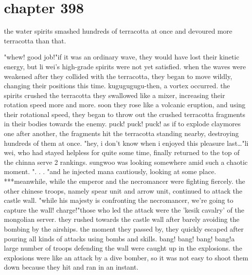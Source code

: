 \section{chapter 398}

the water spirits smashed hundreds of terracotta at once and devoured more terracotta than that.





"whew! good job!"if it was an ordinary wave, they would have lost their kinetic energy, but li wei's high-grade spirits were not yet satisfied.
 when the waves were weakened after they collided with the terracotta, they began to move wildly, changing their positions this time.
kugugugugu-then, a vortex occurred.
 the spirits crushed the terracotta they swallowed like a mixer, increasing their rotation speed more and more.
soon they rose like a volcanic eruption, and using their rotational speed, they began to throw out the crushed terracotta fragments in their bodies towards the enemy.
puck! puck! puck! as if to explode claymores one after another, the fragments hit the terracotta standing nearby, destroying hundreds of them at once.
"hey, i don't know when i enjoyed this pleasure last…"li wei, who had stayed helpless for quite some time, finally returned to the top of the chinna serve 2 rankings.
 sungwoo was looking somewhere amid such a chaotic moment.
".
.
.
"and he injected mana cautiously, looking at some place.
***meanwhile, while the emperor and the necromancer were fighting fiercely.
 the other chinese troops, namely spear unit and arrow unit, continued to attack the castle wall.
"while his majesty is confronting the necromancer, we're going to capture the wall! charge!"those who led the attack were the 'kesik cavalry' of the mongolian server.
 they rushed towards the castle wall after barely avoiding the bombing by the airships.
the moment they passed by, they quickly escaped after pouring all kinds of attacks using bombs and skills.
bang! bang! bang! bang!a large number of troops defending the wall were caught up in the explosions.
the explosions were like an attack by a dive bomber, so it was not easy to shoot them down because they hit and ran in an instant.
 
